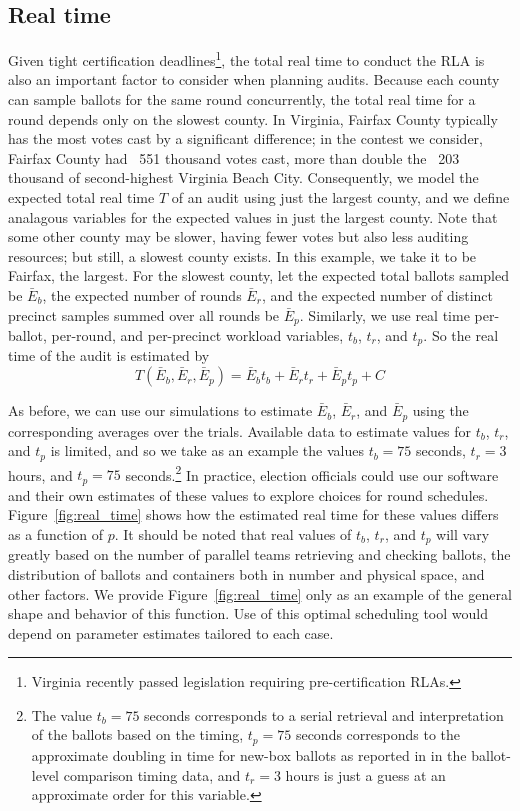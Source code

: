 \subsection{Real time}
Given tight certification deadlines\footnote{Virginia recently passed legislation requiring pre-certification RLAs.}, the total real time to conduct the RLA is also an important factor to consider when planning audits.
Because each county can sample ballots for the same round concurrently, the total real time for a round depends only on the slowest county. 
In Virginia, Fairfax County typically has the most votes cast by a significant difference; in the contest we consider, Fairfax County had ~551 thousand votes cast, more than double the ~203 thousand of second-highest Virginia Beach City.
Consequently, we model the expected total real time $T$ of an audit using just the largest county, and we define analagous variables for the expected values in just the largest county.
Note that some other county may be slower, having fewer votes but also less auditing resources; but still, a slowest county exists. In this example, we take it to be Fairfax, the largest.
For the slowest county, let the expected total ballots sampled be $\bar E_b$, the expected number of rounds $\bar E_r$, and the expected number of distinct precinct samples summed over all rounds be $\bar E_p$.
Similarly, we use real time per-ballot, per-round, and per-precinct workload variables, $t_b$, $t_r$, and $t_p$. So the real time of the audit is estimated by
\begin{equation}
T(\bar E_b, \bar E_r, \bar E_p ) = \bar E_b t_b + \bar E_r t_r + \bar E_p t_p + C
\label{eq:real_time}
\end{equation}

As before, we can use our simulations to estimate $\bar E_b$, $\bar E_r$, and $\bar E_p$ using the corresponding averages over the trials. 
Available data to estimate values for $t_b$, $t_r$, and $t_p$ is limited, and so we take as an example the values $t_b=75$ seconds, $t_r=3$ hours, and $t_p=75$ seconds.\footnote{The value $t_b=75$ seconds corresponds to a serial retrieval and interpretation of the ballots based on the \cite{RI-report} timing, $t_p=75$ seconds corresponds to the approximate doubling in time for new-box ballots as reported in \cite{RI-report} in the ballot-level comparison timing data, and $t_r=3$ hours is just a guess at an approximate order for this variable.} In practice, election officials could use our software and their own estimates of these values to explore choices for round schedules. Figure~\ref{fig:real_time} shows how the estimated real time for these values differs as a function of $p$. It should be noted that real values of $t_b$, $t_r$, and $t_p$ will vary greatly based on the number of parallel teams retrieving and checking ballots, the distribution of ballots and containers both in number and physical space, and other factors. We provide Figure~\ref{fig:real_time} only as an example of the general shape and behavior of this function. Use of this optimal scheduling tool would depend on parameter estimates tailored to each case.

